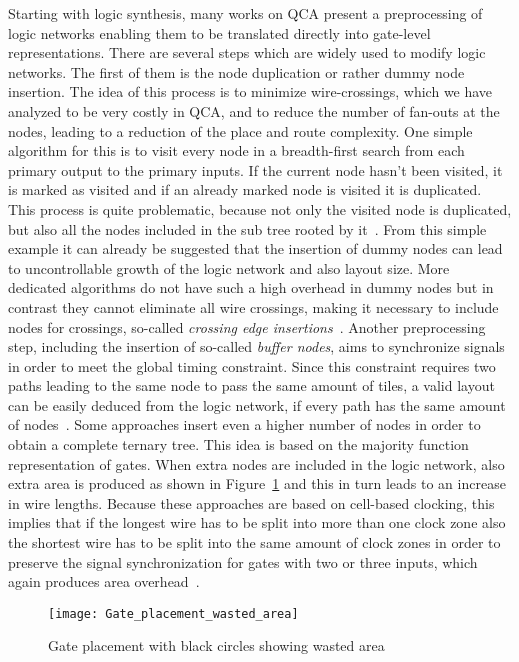 Starting with logic synthesis, many works on QCA present a preprocessing of logic networks enabling them to be translated directly into gate-level representations. There are several steps which are widely used to modify logic networks. The first of them is the node duplication or rather dummy node insertion. The idea of this process is to minimize wire-crossings, which we have analyzed to be very costly in QCA, and to reduce the number of fan-outs at the nodes, leading to a reduction of the place and route complexity. One simple algorithm for this is to visit every node in a breadth-first search from each primary output to the primary inputs. If the current node hasn't been visited, it is marked as visited and if an already marked node is visited it is duplicated. This process is quite problematic, because not only the visited node is duplicated, but also all the nodes included in the sub tree rooted by it~\cite{QCA-LG}. From this simple example it can already be suggested that the insertion of dummy nodes can lead to uncontrollable growth of the logic network and also layout size. More dedicated algorithms do not have such a high overhead in dummy nodes but in contrast they cannot eliminate all wire crossings, making it necessary to include nodes for crossings, so-called \emph{crossing edge insertions}~\cite{node_duplication}. Another preprocessing step, including the insertion of so-called \emph{buffer nodes}, aims to synchronize signals in order to meet the global timing constraint. Since this constraint requires two paths leading to the same node to pass the same amount of tiles, a valid layout can be easily deduced from the logic network, if every path has the same amount of nodes~\cite{dummy_and_buffer_nodes}. Some approaches insert even a higher number of nodes in order to obtain a complete ternary tree. This idea is based on the majority function representation of gates. When extra nodes are included in the logic network, also extra area is produced as shown in Figure~\ref{fig:Gate_placement_wasted_area} and this in turn leads to an increase in wire lengths. Because these approaches are based on cell-based clocking, this implies that if the longest wire has to be split into more than one clock zone also the shortest wire has to be split into the same amount of clock zones in order to preserve the signal synchronization for gates with two or three inputs, which again produces area overhead~\cite{QCA-LG}.

\begin{figure}
	\centering
	\texttt{[image: Gate\_placement\_wasted\_area]}
	\caption{Gate placement with black circles showing wasted area~\cite{QCA-LG}}\label{fig:Gate_placement_wasted_area}
\end{figure}

